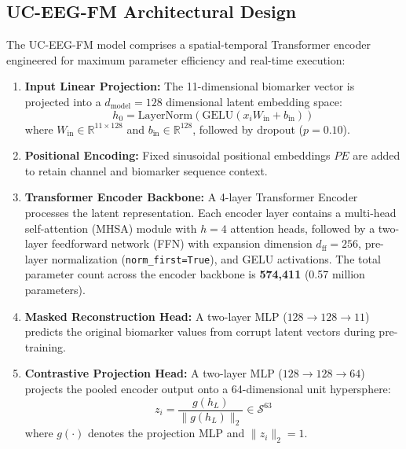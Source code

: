 \documentclass[11pt,a4paper]{article}
\begin{document}
\subsection{UC-EEG-FM Architectural Design}
The UC-EEG-FM model comprises a spatial-temporal Transformer encoder engineered for maximum parameter efficiency and real-time execution:
\begin{enumerate}
    \item \textbf{Input Linear Projection:} The 11-dimensional biomarker vector is projected into a $d_{\text{model}} = 128$ dimensional latent embedding space:
    \begin{equation}
        h_0 = \text{LayerNorm}\left(\text{GELU}\left(x_i W_{\text{in}} + b_{\text{in}}\right)\right)
    \end{equation}
    where $W_{\text{in}} \in \mathbb{R}^{11 \times 128}$ and $b_{\text{in}} \in \mathbb{R}^{128}$, followed by dropout ($p = 0.10$).
    \item \textbf{Positional Encoding:} Fixed sinusoidal positional embeddings $PE$ are added to retain channel and biomarker sequence context.
    \item \textbf{Transformer Encoder Backbone:} A 4-layer Transformer Encoder processes the latent representation. Each encoder layer contains a multi-head self-attention (MHSA) module with $h = 4$ attention heads, followed by a two-layer feedforward network (FFN) with expansion dimension $d_{\text{ff}} = 256$, pre-layer normalization (\texttt{norm\_first=True}), and GELU activations. The total parameter count across the encoder backbone is \textbf{574,411} (0.57 million parameters).
    \item \textbf{Masked Reconstruction Head:} A two-layer MLP ($128 \to 128 \to 11$) predicts the original biomarker values from corrupt latent vectors during pre-training.
    \item \textbf{Contrastive Projection Head:} A two-layer MLP ($128 \to 128 \to 64$) projects the pooled encoder output onto a 64-dimensional unit hypersphere:
    \begin{equation}
        z_i = \frac{g(h_L)}{\|g(h_L)\|_2} \in \mathcal{S}^{63}
    \end{equation}
    where $g(\cdot)$ denotes the projection MLP and $\|z_i\|_2 = 1$.
\end{enumerate}
\end{document}
